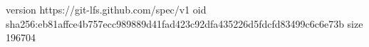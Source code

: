 version https://git-lfs.github.com/spec/v1
oid sha256:eb81affce4b757ecc989889d41fad423c92dfa435226d5fdcfd83499c6c6e73b
size 196704
